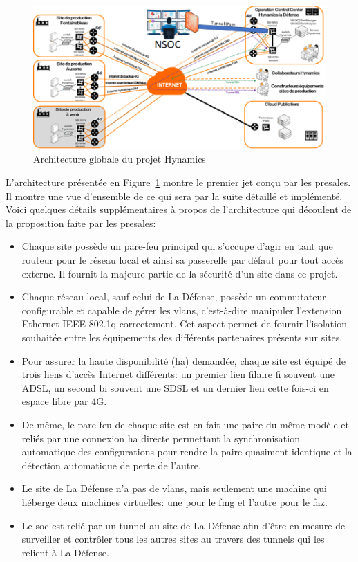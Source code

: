 \documentclass[12pt, oneside, a4paper, titlepage]{report}
\begin{document}
\begin{figure}[h!]
    \centering
    \includegraphics[width = \linewidth]{img/doc-hy/global-arch.png}
    \caption{Architecture globale du projet Hynamics}%
    \label{fig:doc-hy/global-arch}
\end{figure}

L'architecture présentée en Figure~\ref{fig:doc-hy/global-arch} montre le
premier jet conçu par les \gls{presales}. Il montre une vue d'ensemble de ce qui
sera par la suite détaillé et implémenté. Voici quelques détails supplémentaires
à propos de l'architecture qui découlent de la proposition faite par les
\gls{presales}:

\begin{itemize}
    \item Chaque site possède un pare-feu principal qui s'occupe d'agir en tant
        que routeur pour le réseau local et ainsi sa passerelle par défaut pour
        tout accès externe. Il fournit la majeure partie de la sécurité d'un
        site dans ce projet.
    \item Chaque réseau local, sauf celui de La Défense, possède un commutateur
        configurable et capable de gérer les \glspl{vlan}, c'est-à-dire
        manipuler l'extension Ethernet IEEE 802.1q correctement. Cet aspect
        permet de fournir l'isolation souhaitée entre les équipements des
        différents partenaires présents sur sites.
    \item Pour assurer la haute disponibilité (\gls{ha}) demandée, chaque site
        est équipé de trois liens d'accès Internet différents: un premier lien
        filaire \gls{fi} souvent une ADSL, un second \gls{bi} souvent une SDSL
        et un dernier lien cette fois-ci en espace libre par 4G.
    \item De même, le pare-feu de chaque site est en fait une paire du même
        modèle et reliés par une connexion \gls{ha} directe permettant la
        synchronisation automatique des configurations pour rendre la paire
        quasiment identique et la détection automatique de perte de l'autre.
    \item Le site de La Défense n'a pas de \glspl{vlan}, mais seulement une
        machine qui héberge deux machines virtuelles: une pour le \acrfull{fmg}
        et l'autre pour le \acrfull{faz}.
    \item Le \acrfull{soc} est relié par un tunnel au site de La Défense afin
        d'être en mesure de surveiller et contrôler tous les autres sites au
        travers des tunnels qui les relient à La Défense.
\end{itemize}
\end{document}
